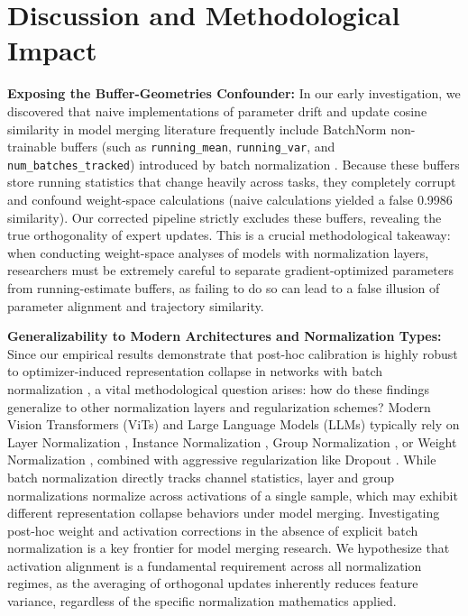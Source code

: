 \documentclass{article}
\theoremstyle{plain}
\theoremstyle{definition}
\theoremstyle{remark}
\begin{document}
\section{Discussion and Methodological Impact}
\label{sec:discussion}

\textbf{Exposing the Buffer-Geometries Confounder:} In our early investigation, we discovered that naive implementations of parameter drift and update cosine similarity in model merging literature frequently include BatchNorm non-trainable buffers (such as \texttt{running\_mean}, \texttt{running\_var}, and \texttt{num\_batches\_tracked}) introduced by batch normalization \cite{ioffe2015batch}. Because these buffers store running statistics that change heavily across tasks, they completely corrupt and confound weight-space calculations (naive calculations yielded a false 0.9986 similarity). Our corrected pipeline strictly excludes these buffers, revealing the true orthogonality of expert updates. This is a crucial methodological takeaway: when conducting weight-space analyses of models with normalization layers, researchers must be extremely careful to separate gradient-optimized parameters from running-estimate buffers, as failing to do so can lead to a false illusion of parameter alignment and trajectory similarity.

\textbf{Generalizability to Modern Architectures and Normalization Types:} Since our empirical results demonstrate that post-hoc calibration is highly robust to optimizer-induced representation collapse in networks with batch normalization \cite{ioffe2015batch}, a vital methodological question arises: how do these findings generalize to other normalization layers and regularization schemes? Modern Vision Transformers (ViTs) and Large Language Models (LLMs) typically rely on Layer Normalization \cite{ba2016layer}, Instance Normalization \cite{ulyanov2016instance}, Group Normalization \cite{wu2018group}, or Weight Normalization \cite{salimans2016weight}, combined with aggressive regularization like Dropout \cite{srivastava2014dropout}. While batch normalization directly tracks channel statistics, layer and group normalizations normalize across activations of a single sample, which may exhibit different representation collapse behaviors under model merging. Investigating post-hoc weight and activation corrections in the absence of explicit batch normalization is a key frontier for model merging research. We hypothesize that activation alignment is a fundamental requirement across all normalization regimes, as the averaging of orthogonal updates inherently reduces feature variance, regardless of the specific normalization mathematics applied.
\end{document}
